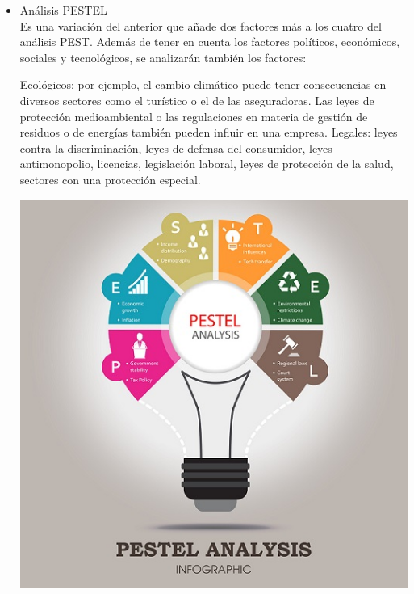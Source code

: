 	\begin{itemize}
\item Análisis PESTEL
\\Es una variación del anterior que añade dos factores más a los cuatro del análisis PEST. Además de tener en cuenta los factores políticos, económicos, sociales y tecnológicos, se analizarán también los factores:

Ecológicos: por ejemplo, el cambio climático puede tener consecuencias en diversos sectores como el turístico o el de las aseguradoras. Las leyes de protección medioambiental o las regulaciones en materia de gestión de residuos o de energías también pueden influir en una empresa.
Legales: leyes contra la discriminación, leyes de defensa del consumidor, leyes antimonopolio, licencias, legislación laboral, leyes de protección de la salud, sectores con una protección especial.
		\begin{center}
		\includegraphics[width=15cm]{./Imagenes/Imagen2}
		\end{center}
	\end{itemize} 
\\
